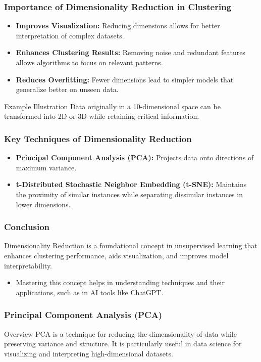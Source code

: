 \documentclass[aspectratio=169]{beamer}
\begin{document}
\begin{frame}[fragile]
    \frametitle{Importance of Dimensionality Reduction in Clustering}
    \begin{itemize}
        \item \textbf{Improves Visualization:} Reducing dimensions allows for better interpretation of complex datasets.
        \item \textbf{Enhances Clustering Results:} Removing noise and redundant features allows algorithms to focus on relevant patterns.
        \item \textbf{Reduces Overfitting:} Fewer dimensions lead to simpler models that generalize better on unseen data.
    \end{itemize}
    \begin{block}{Example Illustration}
        Data originally in a 10-dimensional space can be transformed into 2D or 3D while retaining critical information.
    \end{block}
\end{frame}

\begin{frame}[fragile]
    \frametitle{Key Techniques of Dimensionality Reduction}
    \begin{itemize}
        \item \textbf{Principal Component Analysis (PCA):} Projects data onto directions of maximum variance.
        \item \textbf{t-Distributed Stochastic Neighbor Embedding (t-SNE):} Maintains the proximity of similar instances while separating dissimilar instances in lower dimensions.
    \end{itemize}
\end{frame}

\begin{frame}[fragile]
    \frametitle{Conclusion}
    Dimensionality Reduction is a foundational concept in unsupervised learning that enhances clustering performance, aids visualization, and improves model interpretability. 
    \begin{itemize}
        \item Mastering this concept helps in understanding techniques and their applications, such as in AI tools like ChatGPT.
    \end{itemize}
\end{frame}

\begin{frame}[fragile]
    \frametitle{Principal Component Analysis (PCA)}
    \begin{block}{Overview}
        PCA is a technique for reducing the dimensionality of data while preserving variance and structure. 
        It is particularly useful in data science for visualizing and interpreting high-dimensional datasets.
    \end{block}
\end{frame}
\end{document}

